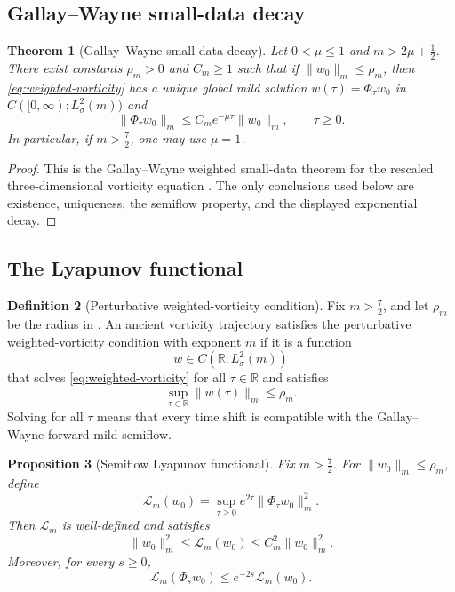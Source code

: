 \documentclass[11pt]{amsart}
\theoremstyle{plain}
\newtheorem{theorem}{Theorem}[section]
\newtheorem{proposition}[theorem]{Proposition}
\theoremstyle{definition}
\newtheorem{definition}[theorem]{Definition}
\theoremstyle{remark}
\numberwithin{equation}{section}
\begin{document}
\subsection{Gallay--Wayne small-data decay}

\begin{theorem}[Gallay--Wayne small-data decay]\label{thm:gallay}
Let \(0<\mu\le1\) and \(m>2\mu+\frac12\).  There exist constants
\(\rho_m>0\) and \(C_m\ge1\) such that if \(\|w_0\|_m\le\rho_m\), then
\eqref{eq:weighted-vorticity} has a unique global mild solution
\(w(\tau)=\Phi_\tau w_0\) in \(C([0,\infty);L^2_\sigma(m))\) and
\[
   \|\Phi_\tau w_0\|_m
   \le
   C_m e^{-\mu\tau}\|w_0\|_m,\qquad \tau\ge0.
\]
In particular, if \(m>\frac72\), one may use \(\mu=1\).
\end{theorem}

\begin{proof}
This is the Gallay--Wayne weighted small-data theorem for the rescaled
three-dimensional vorticity equation \cite{GallayWayne2002}.  The only
conclusions used below are existence, uniqueness, the semiflow property, and
the displayed exponential decay.
\end{proof}

\subsection{The Lyapunov functional}

\begin{definition}[Perturbative weighted-vorticity condition]
\label{def:weighted-vorticity-condition}
Fix \(m>\frac72\), and let \(\rho_m\) be the radius in .
An ancient vorticity trajectory satisfies the perturbative
weighted-vorticity condition with exponent \(m\) if it is a function
\[
   w\in C(\mathbb R;L^2_\sigma(m))
\]
that solves \eqref{eq:weighted-vorticity} for all \(\tau\in\mathbb R\) and
satisfies
\[
   \sup_{\tau\in\mathbb R}\|w(\tau)\|_m\le\rho_m .
\]
Solving for all \(\tau\) means that every time shift is compatible with the
Gallay--Wayne forward mild semiflow.
\end{definition}

\begin{proposition}[Semiflow Lyapunov functional]\label{prop:weighted-lyap}
Fix \(m>\frac72\).  For \(\|w_0\|_m\le\rho_m\), define
\begin{equation}\label{eq:weighted-lyap}
   \mathcal L_m(w_0)
   =
   \sup_{\tau\ge0}e^{2\tau}\|\Phi_\tau w_0\|_m^2 .
\end{equation}
Then \(\mathcal L_m\) is well-defined and satisfies
\begin{equation}\label{eq:weighted-coercive}
   \|w_0\|_m^2
   \le
   \mathcal L_m(w_0)
   \le
   C_m^2\|w_0\|_m^2 .
\end{equation}
Moreover, for every \(s\ge0\),
\begin{equation}\label{eq:weighted-contract}
   \mathcal L_m(\Phi_s w_0)
   \le
   e^{-2s}\mathcal L_m(w_0).
\end{equation}
\end{proposition}
\end{document}
